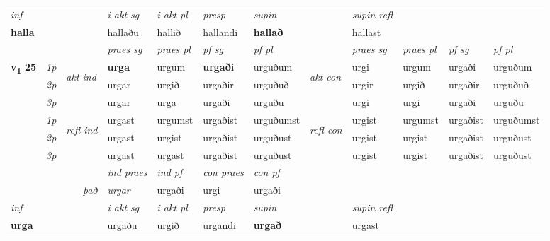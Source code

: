 \begin{longtable}[l]{X>{\footnotesize\itshape}llXXXXlXXXX}
\cmidrule{4-7}
   {\textit{inf}} & &  & \textit{i akt sg} & \textit{i akt pl}   & \textit{presp} & \textit{supin} && \textit{supin refl}  \\*
  {\textbf{halla}} & && hallaðu  & hallið   & hallandi &  \textbf{hallað} && hallast  \\*

\midrule

 & &   & \textit{praes sg}  & \textit{praes pl}    & \textit{ pf sg} & \textit{pf pl} & & \textit{praes sg}  & \textit{praes pl}    & \textit{pf sg} & \textit{pf pl }  \\ \cmidrule{4-7} \cmidrule{9-12}
 \multirow{2}{*}{{{\textbf{v{\textsubscript{1}}} \Large{\textbf{25}}}}}  & 1p & \multirow{3}{*}{\begin{turn}{90}\textit{akt ind}\end{turn}} & \textbf{urga} & urgum & \textbf{urgaði} & urguðum & \multirow{3}{*}{\begin{turn}{90}\textit{akt con}\end{turn}} &urgi & urgum & urgaði & urguðum\\*
 & 2p &  &  urgar  & urgið & urgaðir & urguðuð & & urgir & urgið & urgaðir & urguðuð \\*
 & 3p &  & urgar & urga & urgaði & urguðu & & urgi & urgi& urgaði & urguðu \\*
\cmidrule{4-7} \cmidrule{9-12}
 & 1p & \multirow{3}{*}{\begin{turn}{90}\textit{refl ind}\end{turn}}  & urgast & urgumst & urgaðist & urguðumst & \multirow{3}{*}{\begin{turn}{90}\textit{refl con}\end{turn}}  &urgist & urgumst & urgaðist & urguðumst \\*
 & 2p &  & urgast & urgist & urgaðist & urguðust & &urgist & urgist & urgaðist & urguðust \\*
 & 3p  & & urgast & urgast & urgaðist & urguðust & & urgist & urgist& urgaðist & urguðust \\*
\cmidrule{4-7} \cmidrule{9-12}

   && &  \textit{ind praes} & \textit{ind pf} & \textit{con praes} & \textit{con pf} \\*
\multicolumn{3}{r}{\textit{það}} & urgar & urgaði & urgi & urgaði \\*

\cmidrule{4-7}
   {\textit{inf}} & &  & \textit{i akt sg} & \textit{i akt pl}   & \textit{presp} & \textit{supin} && \textit{supin refl}  \\*
  {\textbf{urga}} & && urgaðu  & urgið   & urgandi &  \textbf{urgað} && urgast  \\*


\end{longtable}
